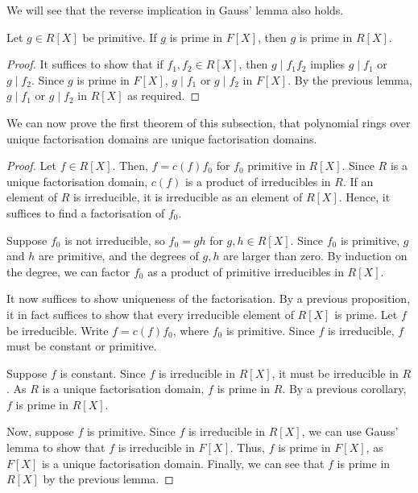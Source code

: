 \begin{remark}
	We will see that the reverse implication in Gauss' lemma also holds.
\end{remark}
\begin{lemma}
	Let \( g \in R[X] \) be primitive.
	If \( g \) is prime in \( F[X] \), then \( g \) is prime in \( R[X] \).
\end{lemma}
\begin{proof}
	It suffices to show that if \( f_1, f_2 \in R[X] \), then \( g \mid f_1 f_2 \) implies \( g \mid f_1 \) or \( g \mid f_2 \).
	Since \( g \) is prime in \( F[X] \), \( g \mid f_1 \) or \( g \mid f_2 \) in \( F[X] \).
	By the previous lemma, \( g \mid f_1 \) or \( g \mid f_2 \) in \( R[X] \) as required.
\end{proof}
We can now prove the first theorem of this subsection, that polynomial rings over unique factorisation domains are unique factorisation domains.
\begin{proof}
	Let \( f \in R[X] \).
	Then, \( f = c(f) f_0 \) for \( f_0 \) primitive in \( R[X] \).
	Since \( R \) is a unique factorisation domain, \( c(f) \) is a product of irreducibles in \( R \).
	If an element of \( R \) is irreducible, it is irreducible as an element of \( R[X] \).
	Hence, it suffices to find a factorisation of \( f_0 \).

	Suppose \( f_0 \) is not irreducible, so \( f_0 = gh \) for \( g,h \in R[X] \).
	Since \( f_0 \) is primitive, \( g \) and \( h \) are primitive, and the degrees of \( g, h \) are larger than zero.
	By induction on the degree, we can factor \( f_0 \) as a product of primitive irreducibles in \( R[X] \).

	It now suffices to show uniqueness of the factorisation.
	By a previous proposition, it in fact suffices to show that every irreducible element of \( R[X] \) is prime.
	Let \( f \) be irreducible.
	Write \( f = c(f) f_0 \), where \( f_0 \) is primitive.
	Since \( f \) is irreducible, \( f \) must be constant or primitive.

	Suppose \( f \) is constant.
	Since \( f \) is irreducible in \( R[X] \), it must be irreducible in \( R \).
	As \( R \) is a unique factorisation domain, \( f \) is prime in \( R \).
	By a previous corollary, \( f \) is prime in \( R[X] \).

	Now, suppose \( f \) is primitive.
	Since \( f \) is irreducible in \( R[X] \), we can use Gauss' lemma to show that \( f \) is irreducible in \( F[X] \).
	Thus, \( f \) is prime in \( F[X] \), as \( F[X] \) is a unique factorisation domain.
	Finally, we can see that \( f \) is prime in \( R[X] \) by the previous lemma.
\end{proof}
